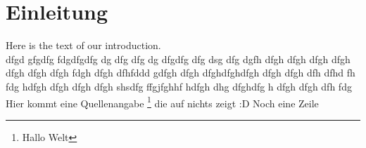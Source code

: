 \section{Einleitung}
Here is the text of our introduction. \\
dfgd gfgdfg fdgdfgdfg dg dfg dfg dg dfgdfg dfg dsg dfg dgfh dfgh dfgh dfgh dfgh dfgh dfgh dfgh fdgh dfgh dfhfddd gdfgh dfgh dfghdfghdfgh dfgh dfgh dfh dfhd fh fdg hdfgh dfgh dfgh dfgh shsdfg ffgjfghhf hdfgh dhg dfghdfg h dfgh dfgh dfh fdg \\
Hier kommt eine Quellenangabe \footnote[1]{Hallo Welt} die auf nichts zeigt :D
Noch eine Zeile
